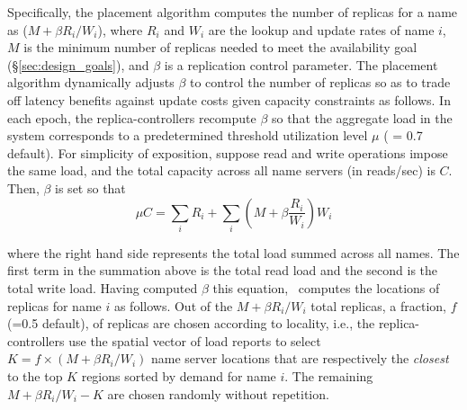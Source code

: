 {


Specifically, the placement algorithm computes the number of replicas for a name as ($M+ \beta R_i/W_i$), where $R_i$ and $W_i$ are the lookup and update rates of name $i$, $M$ is the minimum number of replicas needed to meet the availability goal (\S \ref{sec:design_goals}), and $\beta$ is a replication control parameter.  The placement algorithm dynamically adjusts $\beta$ to control the number of replicas so as to trade off latency benefits against update costs given capacity constraints as follows. In each epoch, the replica-controllers recompute $\beta$ so that the aggregate load in the system corresponds to a predetermined threshold utilization level $\mu$ ( = 0.7 default). For simplicity of exposition, suppose read and write operations impose the same load, and the total capacity across all name servers (in reads/sec) is $C$. Then, $\beta$ is set so that  
\vsp
\begin{equation}
\mu C = \sum_i R_i  + \sum_i (M + \beta  \frac{R_i}{W_i}) W_i
\label{eq:mu}
\end{equation}
\vsp
\vsp

 where the right hand side represents the total load summed across all names. The first term in the summation above is the total read load and the second is the total write load. 
 Having computed $\beta$ this equation, \auspice\ computes the locations of replicas for name $i$ as follows. Out of the $M + \beta R_i/W_i$ total replicas, a fraction, $f$ (=0.5 default), of replicas are chosen according to locality, i.e., the replica-controllers use the spatial vector of load reports to select $K = f \times(M + \beta R_i/W_i)$ name server locations that are respectively the {\em closest} to the top $K$ regions sorted by demand for name $i$. The remaining $M + \beta R_i/W_i - K$  are chosen randomly without repetition.
 
}
